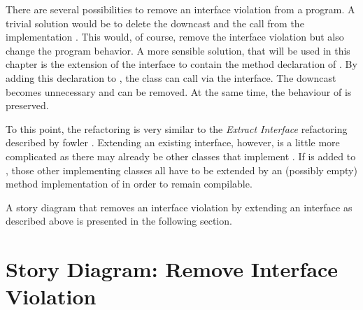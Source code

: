 There are several possibilities to remove an interface violation from a program. A trivial solution would be to delete the downcast and the call from the implementation . This would, of course, remove the interface violation but also change the program behavior. A more sensible solution, that will be used in this chapter is the extension of the interface  to contain the method declaration of . By adding this declaration to , the class  can call  via the interface. The downcast becomes unnecessary and can be removed. At the same time, the behaviour of  is preserved.

To this point, the refactoring is very similar to the \emph{Extract Interface} refactoring described by fowler \cite{Fow99}. Extending an existing interface, however, is a little more complicated as there may already be other classes that implement . If  is added to , those other implementing classes all have to be extended by an (possibly empty) method implementation of  in order to remain compilable.

A story diagram that removes an interface violation by extending an interface as described above is presented in the following section.

\section{Story Diagram: Remove Interface Violation}

